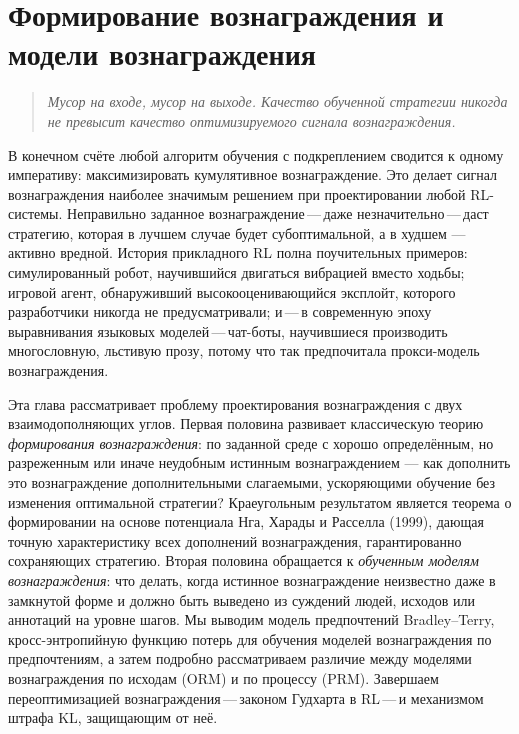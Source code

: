 \chapter[Формирование и модели вознаграждения]{Формирование вознаграждения и модели вознаграждения}
\label{ch:reward-models}

\begin{quote}
\itshape
Мусор на входе, мусор на выходе. Качество обученной стратегии никогда не превысит качество оптимизируемого сигнала вознаграждения.
\end{quote}

\bigskip

В конечном счёте любой алгоритм обучения с подкреплением сводится к одному императиву: максимизировать кумулятивное вознаграждение. Это делает сигнал вознаграждения наиболее значимым решением при проектировании любой RL-системы. Неправильно заданное вознаграждение\,---\,даже незначительно\,---\,даст стратегию, которая в лучшем случае будет субоптимальной, а в худшем --- активно вредной. История прикладного RL полна поучительных примеров: симулированный робот, научившийся двигаться вибрацией вместо ходьбы; игровой агент, обнаруживший высокооценивающийся эксплойт, которого разработчики никогда не предусматривали; и\,---\,в современную эпоху выравнивания языковых моделей\,---\,чат-боты, научившиеся производить многословную, льстивую прозу, потому что так предпочитала прокси-модель вознаграждения.

Эта глава рассматривает проблему проектирования вознаграждения с двух взаимодополняющих углов. Первая половина развивает классическую теорию \emph{формирования вознаграждения}: по заданной среде с хорошо определённым, но разреженным или иначе неудобным истинным вознаграждением --- как дополнить это вознаграждение дополнительными слагаемыми, ускоряющими обучение без изменения оптимальной стратегии? Краеугольным результатом является теорема о формировании на основе потенциала Нга, Харады и Расселла (1999), дающая точную характеристику всех дополнений вознаграждения, гарантированно сохраняющих стратегию. Вторая половина обращается к \emph{обученным моделям вознаграждения}: что делать, когда истинное вознаграждение неизвестно даже в замкнутой форме и должно быть выведено из суждений людей, исходов или аннотаций на уровне шагов. Мы выводим модель предпочтений Bradley--Terry, кросс-энтропийную функцию потерь для обучения моделей вознаграждения по предпочтениям, а затем подробно рассматриваем различие между моделями вознаграждения по исходам (ORM) и по процессу (PRM). Завершаем переоптимизацией вознаграждения\,---\,законом Гудхарта в RL\,---\,и механизмом штрафа KL, защищающим от неё.

